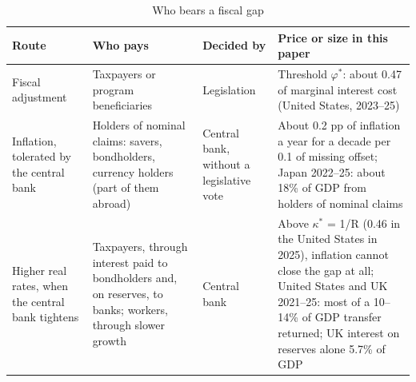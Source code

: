 \begin{table}[htbp]
\centering
\caption{Who bears a fiscal gap}\label{tab:whopays}
\footnotesize
\begin{tabularx}{\textwidth}{>{\raggedright\arraybackslash}X>{\raggedright\arraybackslash}X>{\raggedright\arraybackslash}X>{\raggedright\arraybackslash}X}
\toprule
Route & Who pays & Decided by & Price or size in this paper \\
\midrule
Fiscal adjustment & Taxpayers or program beneficiaries & Legislation & Threshold $\varphi^*$: about 0.47 of marginal interest cost (United States, 2023–25) \\
Inflation, tolerated by the central bank & Holders of nominal claims: savers, bondholders, currency holders (part of them abroad) & Central bank, without a legislative vote & About 0.2 pp of inflation a year for a decade per 0.1 of missing offset; Japan 2022–25: about 18\% of GDP from holders of nominal claims \\
Higher real rates, when the central bank tightens & Taxpayers, through interest paid to bondholders and, on reserves, to banks; workers, through slower growth & Central bank & Above $\kappa^*$ = 1/R (0.46 in the United States in 2025), inflation cannot close the gap at all; United States and UK 2021–25: most of a 10–14\% of GDP transfer returned; UK interest on reserves alone 5.7\% of GDP \\
\bottomrule
\end{tabularx}
\end{table}
